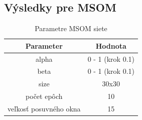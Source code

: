 \subsection{Výsledky pre MSOM}

\begin{table}[h!]
    \centering
    \begin{tabular}{|c|c|} 
     \hline
     Parameter & Hodnota \\ 
     \hline\hline
     alpha & 0 - 1 (krok 0.1)  \\ 
     \hline
     beta & 0 - 1  (krok 0.1) \\ 
     \hline
     size & 30x30  \\
     \hline
     počet epôch & 10  \\
     \hline
     veľkosť posuvného okna & 15  \\
     \hline
    \end{tabular}
    \caption{Parametre MSOM siete}
    \label{table:1}
    \end{table}
    

